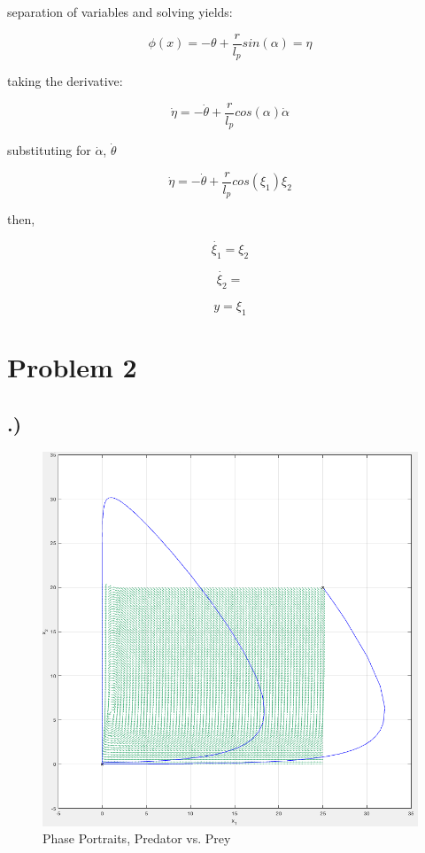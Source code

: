\documentclass[10pt, letterpaper]{article}
\begin{document}
separation of variables and solving yields:

\[
\phi(x) = -\theta + \frac{r}{l_p}{sin}(\alpha) = \eta
\]

taking the derivative:

\[
\dot{\eta} = -\dot{\theta} + \frac{r}{l_p}{cos}(\alpha)\dot{\alpha}
\]

substituting for $\dot{\alpha}$, $\dot{\theta}$

\[
\dot{\eta} = -\dot{\theta} + \frac{r}{l_p}{cos}(\xi_{1})\xi_{2}
\]

then,

\[
\dot{\xi_{1}} = \xi_{2}
\]

\[
\dot{\xi_{2}} = 
\]

\[
y = \xi_{1}
\]

\section{Problem 2}

\subsection{.)}

\begin{figure}[h]
\caption{Phase Portraits, Predator vs. Prey}
\centering
\includegraphics[scale=0.3]{HW2_2}
\end{figure}
\end{document}
